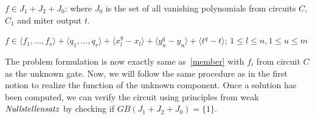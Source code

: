 $f \in J_1 + J_2 + J_0$: where $J_0$ is the set of all vanishing polynomials from circuits $C$, $C_1$ and miter output $t$.

{\small $f \in \langle f_1,\dots,f_s\rangle + \langle q_1,\dots,q_r\rangle + \langle x_l^q-x_l\rangle + \langle y_u^q-y_u\rangle + \langle t^q-t\rangle$; $1\le l \le n,1\le u \le m$}

The problem formulation is now exactly same as~\eqref{member} with $f_i$ from circuit $C$ as the unknown gate. Now, we will follow the same procedure as in the first notion to realize the function of the unknown component. Once a solution has been computed, we can verify the circuit using principles from weak $\it{Nullstellensatz}$ by checking if $GB(J_1+J_2+J_0)=\{1\}$.







